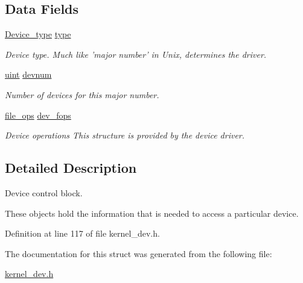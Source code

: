 \subsection*{Data Fields}
\begin{DoxyCompactItemize}
\item 
\hypertarget{structdevice__control__block_a35a45268132777177a33513c747633c4}{\hyperlink{group__dev_ga879ceac20e83b2375e5b49f4379b0c90}{Device\-\_\-type} \hyperlink{structdevice__control__block_a35a45268132777177a33513c747633c4}{type}}\label{structdevice__control__block_a35a45268132777177a33513c747633c4}

\begin{DoxyCompactList}\small\item\em Device type. Much like 'major number' in Unix, determines the driver. \end{DoxyCompactList}\item 
\hypertarget{structdevice__control__block_a25d8f038a1c6d41f445d078276117fba}{\hyperlink{bios_8h_a91ad9478d81a7aaf2593e8d9c3d06a14}{uint} \hyperlink{structdevice__control__block_a25d8f038a1c6d41f445d078276117fba}{devnum}}\label{structdevice__control__block_a25d8f038a1c6d41f445d078276117fba}

\begin{DoxyCompactList}\small\item\em Number of devices for this major number. \end{DoxyCompactList}\item 
\hypertarget{structdevice__control__block_a2945d5da96f40ff7fae94e295624a7c7}{\hyperlink{group__dev_gaab625d8ae3a95e942ed10ed1579f5042}{file\-\_\-ops} \hyperlink{structdevice__control__block_a2945d5da96f40ff7fae94e295624a7c7}{dev\-\_\-fops}}\label{structdevice__control__block_a2945d5da96f40ff7fae94e295624a7c7}

\begin{DoxyCompactList}\small\item\em Device operations This structure is provided by the device driver. \end{DoxyCompactList}\end{DoxyCompactItemize}


\subsection{Detailed Description}
Device control block. 

These objects hold the information that is needed to access a particular device. 

Definition at line 117 of file kernel\-\_\-dev.\-h.



The documentation for this struct was generated from the following file\-:\begin{DoxyCompactItemize}
\item 
\hyperlink{kernel__dev_8h}{kernel\-\_\-dev.\-h}\end{DoxyCompactItemize}
